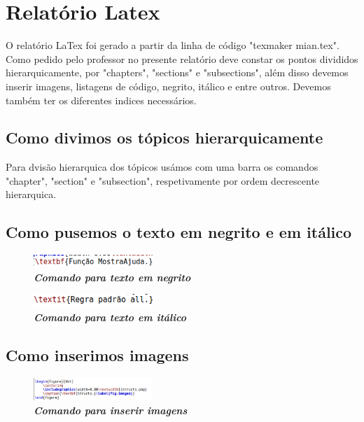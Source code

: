 \documentclass[a4wide]{report}
\begin{document}
{{{{\newpage
\section{Relatório Latex}
\Large
	O relatório LaTex foi gerado a partir da linha de código "texmaker mian.tex". Como pedido pelo professor no presente relatório deve constar os pontos divididos hierarquicamente, por "chapters", "sections" e "subsections", além disso devemos inserir imagens, listagens de código, negrito, itálico e entre outros. Devemos também ter os diferentes indices necessários.
	
\subsection{Como divimos os tópicos hierarquicamente}
\Large
Para dvisão hierarquica dos tópicos usámos com uma barra os comandos "chapter", "section" e "subsection", respetivamente por ordem decrescente hierarquica.

\subsection{Como pusemos o texto em negrito e em itálico}
\Large

\begin{figure}[hbt]
    \centering
    \includegraphics[width=0.40\textwidth]{ima2.png}
    \caption{\textbf{\textit{Comando para texto em negrito}} \label{fig:imagem}}
\end{figure}

\begin{figure}[hbt]
    \centering
    \includegraphics[width=0.40\textwidth]{ima5.png}
    \caption{\textbf{\textit{Comando para texto em itálico}} \label{fig:imagem}}
\end{figure}

\subsection{Como inserimos imagens}
\Large

\begin{figure}[hbt]
    \centering
    \includegraphics[width=0.40\textwidth]{ima1.png}
    \caption{\textbf{\textit{Comando para inserir imagens}} \label{fig:imagem}}
\end{figure}

}}}}
\end{document}
